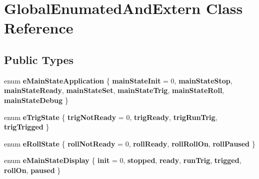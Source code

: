 \hypertarget{class_global_enumated_and_extern}{}\section{Global\+Enumated\+And\+Extern Class Reference}
\label{class_global_enumated_and_extern}
\subsection*{Public Types}
\begin{DoxyCompactItemize}
\item 
\mbox{\label{class_global_enumated_and_extern_a430adcded6c74bf7c7de431adeabad11}} 
enum {\bfseries e\+Main\+State\+Application} \{ \newline
{\bfseries main\+State\+Init} = 0, 
{\bfseries main\+State\+Stop}, 
{\bfseries main\+State\+Ready}, 
{\bfseries main\+State\+Set}, 
\newline
{\bfseries main\+State\+Trig}, 
{\bfseries main\+State\+Roll}, 
{\bfseries main\+State\+Debug}
 \}
\item 
\mbox{\label{class_global_enumated_and_extern_a9285d747a087ccb9c821770462039c04}} 
enum {\bfseries e\+Trig\+State} \{ {\bfseries trig\+Not\+Ready} = 0, 
{\bfseries trig\+Ready}, 
{\bfseries trig\+Run\+Trig}, 
{\bfseries trig\+Trigged}
 \}
\item 
\mbox{\label{class_global_enumated_and_extern_af8159024389eceac15fea44b48f48b8b}} 
enum {\bfseries e\+Roll\+State} \{ {\bfseries roll\+Not\+Ready} = 0, 
{\bfseries roll\+Ready}, 
{\bfseries roll\+Roll\+On}, 
{\bfseries roll\+Paused}
 \}
\item 
\mbox{\label{class_global_enumated_and_extern_a8ead8c9e81876881e595ccf8472f49ef}} 
enum {\bfseries e\+Main\+State\+Display} \{ \newline
{\bfseries init} = 0, 
{\bfseries stopped}, 
{\bfseries ready}, 
{\bfseries run\+Trig}, 
\newline
{\bfseries trigged}, 
{\bfseries roll\+On}, 
{\bfseries paused}
 \}
\item 
\mbox{\label{class_global_enumated_and_extern_a5939b05020fd4efc1593f159462f6332}} 

\end{DoxyCompactItemize}
